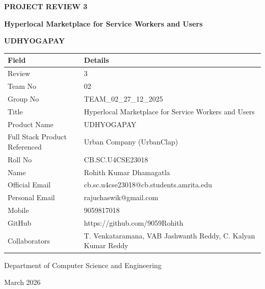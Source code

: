 \documentclass[12pt,a4paper]{article}
\begin{document}
\begin{titlepage}
    \centering
    \vspace*{2cm}
    
    {\Huge\bfseries PROJECT REVIEW 3\par}
    \vspace{1cm}
    {\LARGE\bfseries Hyperlocal Marketplace for Service Workers and Users\par}
    \vspace{0.5cm}
    {\Large\textbf{UDHYOGAPAY}\par}
    
    \vspace{2cm}
    
    \begin{tabular}{|p{5cm}|p{8cm}|}
    \hline
    \rowcolor{lightgray}
    \textbf{Field} & \textbf{Details} \\
    \hline
    Review & 3 \\
    \hline
    Team No & 02 \\
    \hline
    Group No & TEAM\_02\_27\_12\_2025 \\
    \hline
    Title & Hyperlocal Marketplace for Service Workers and Users \\
    \hline
    Product Name & UDHYOGAPAY \\
    \hline
    Full Stack Product Referenced & Urban Company (UrbanClap) \\
    \hline
    Roll No & CB.SC.U4CSE23018 \\
    \hline
    Name & Rohith Kumar Dhamagatla \\
    \hline
    Official Email & cb.sc.u4cse23018@cb.students.amrita.edu \\
    \hline
    Personal Email & rajuchaswik@gmail.com \\
    \hline
    Mobile & 9059817018 \\
    \hline
    GitHub & https://github.com/9059Rohith \\
    \hline
    Collaborators & T. Venkataramana, VAB Jashwanth Reddy, C. Kalyan Kumar Reddy \\
    \hline
    \end{tabular}
    
    \vfill
    
    {\large Department of Computer Science and Engineering\par}
    {\large March 2026\par}
\end{titlepage}
\end{document}

